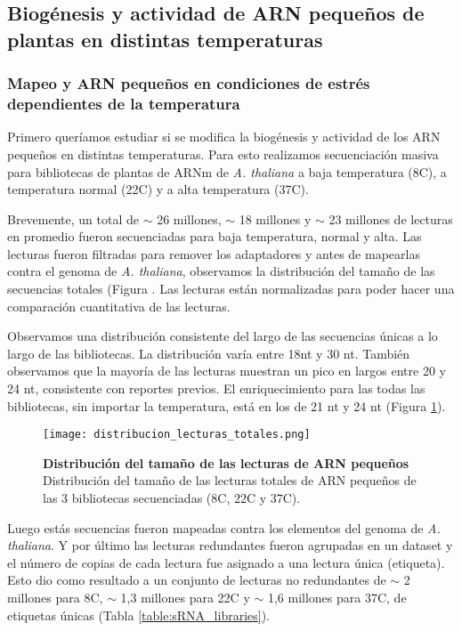 \subsection{Biogénesis y actividad de ARN pequeños de plantas en distintas temperaturas}

\subsubsection{Mapeo y ARN pequeños en condiciones de estrés dependientes de la temperatura}

Primero queríamos estudiar si se modifica la biogénesis y actividad de los ARN pequeños en distintas temperaturas.
Para esto realizamos secuenciación masiva para bibliotecas de plantas de ARNm de \textit{A. thaliana} a baja temperatura (8\degree C), a temperatura normal (22\degree C) y a alta temperatura (37\degree C).

Brevemente, un total de $\sim$ 26 millones, $\sim$ 18 millones y $\sim$ 23 millones de lecturas en promedio fueron secuenciadas para baja temperatura, normal y alta.
Las lecturas fueron filtradas para remover los adaptadores y antes de mapearlas contra el genoma de \textit{A. thaliana}, observamos la distribución del tamaño de las secuencias totales (Figura \label{fig:distribucion_lecturas_totales}.
Las lecturas están normalizadas para poder hacer una comparación cuantitativa de las lecturas.

Observamos una distribución consistente del largo de las secuencias únicas a lo largo de las bibliotecas.
La distribución varía entre 18nt y 30 nt.
También observamos que la mayoría de las lecturas muestran un pico en largos entre 20 y 24 nt, consistente con reportes previos.
El enriquecimiento para las todas las bibliotecas, sin importar la temperatura, está en los de 21 nt y 24 nt (Figura \ref{fig:distribucion_lecturas_totales}).

\begin{figure}[htbp!] 
    \centering    
    \texttt{[image: distribucion\_lecturas\_totales.png]}
    \caption[Distribución del tamaño de las lecturas totales de ARN pequeños]{
    \textbf{Distribución del tamaño de las lecturas de ARN pequeños}
    Distribución del tamaño de las lecturas totales de ARN pequeños de las 3 bibliotecas secuenciadas (8\degree C, 22\degree C y 37\degree C).
   }
     \label{fig:distribucion_lecturas_totales}
\end{figure}

Luego estás secuencias fueron mapeadas contra los elementos del genoma de \textit{A. thaliana}.
Y por último las lecturas redundantes fueron agrupadas en un dataset y el número de copias de cada lectura fue asignado a una lectura única (etiqueta).
Esto dio como resultado a un conjunto de lecturas no redundantes de $\sim$ 2 millones para 8\degree C, $\sim$ 1,3 millones para 22\degree C y $\sim$ 1,6 millones para 37\degree C, de etiquetas únicas (Tabla \ref{table:sRNA_libraries}).

